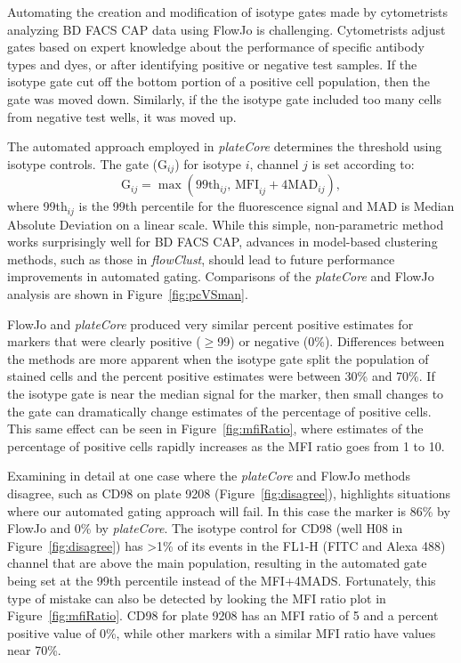\documentclass[12pt]{article}
\newcommand{\Rpackage}[1]{{\textit{#1}}}
\begin{document}
Automating the creation and modification of isotype gates made by cytometrists
analyzing BD FACS CAP data using FlowJo is challenging. Cytometrists adjust
gates based on expert knowledge about the performance of specific antibody
types and dyes, or after identifying positive or negative test samples. If the
isotype gate cut off the bottom portion of a positive cell population, then
the gate was moved down.  Similarly, if the the isotype gate included too many
cells from negative test wells, it was moved up.

The automated approach employed in \Rpackage{plateCore} determines the
threshold using isotype controls. The gate (G$_{ij}$) for isotype $i$, channel
$j$ is set according to:
\begin{equation}
\text{G}_{ij} = \max (\text{99th}_{ij} \text{, MFI}_{ij}+ 4 \text{MAD}_{ij}),
\label{isoGate}
\end{equation}
where 99th$_{ij}$ is the 99th percentile for the fluorescence signal and MAD is
Median Absolute Deviation on a linear scale. While this simple, non-parametric
method works surprisingly well for BD FACS CAP, advances in model-based
clustering methods, such as those in \Rpackage{flowClust}, should lead to
future performance improvements in automated gating. Comparisons of the
\Rpackage{plateCore} and FlowJo analysis are shown in Figure~\ref{fig:pcVSman}.

FlowJo and \Rpackage{plateCore} produced very similar percent positive
estimates for markers that were clearly positive ($\ge$99) or negative (0\%).
Differences between the methods are more apparent when the isotype gate split
the population of stained cells and the percent positive estimates were between
30\% and 70\%. If the isotype gate is near the median signal for the marker,
then small changes to the gate can dramatically change estimates of the
percentage of positive cells. This same effect can be seen in
Figure~\ref{fig:mfiRatio}, where estimates of the percentage of positive cells
rapidly increases as the MFI ratio goes from 1 to 10.

Examining in detail at one case where the \Rpackage{plateCore} and FlowJo
methods disagree, such as CD98 on plate 9208 (Figure~\ref{fig:disagree}),
highlights situations where our automated gating approach will fail. In this
case the marker is 86\% by FlowJo and 0\% by \Rpackage{plateCore}. The isotype
control for CD98 (well H08 in Figure~\ref{fig:disagree}) has >1\% of its events
in the FL1-H (FITC and Alexa 488) channel that are above the main population,
resulting in the automated gate being set at the 99th percentile instead of the
MFI+4MADS. Fortunately, this type of mistake can also be detected by looking
the MFI ratio plot in Figure~\ref{fig:mfiRatio}. CD98 for plate 9208 has an MFI
ratio of 5 and a percent positive value of 0\%, while other markers with a
similar MFI ratio have values near 70\%. 
\end{document}
